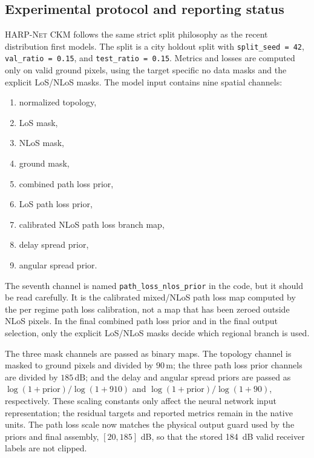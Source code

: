 \subsection{Experimental protocol and reporting status}

\textsc{HARP-Net CKM} follows the same strict split philosophy as the recent
distribution first models. The split is a city holdout split with
\texttt{split\_seed = 42}, \texttt{val\_ratio = 0.15}, and
\texttt{test\_ratio = 0.15}. Metrics and losses are computed only on valid
ground pixels, using the target specific no data masks and the explicit
LoS/NLoS masks. The model input contains nine spatial channels:

\begin{enumerate}
\item normalized topology,
\item LoS mask,
\item NLoS mask,
\item ground mask,
\item combined path loss prior,
\item LoS path loss prior,
\item calibrated NLoS path loss branch map,
\item delay spread prior,
\item angular spread prior.
\end{enumerate}

The seventh channel is named \texttt{path\_loss\_nlos\_prior} in the code,
but it should be read carefully. It is the calibrated mixed/NLoS path loss map
computed by the per regime path loss calibration, not a map that has been
zeroed outside NLoS pixels. In the final combined path loss prior and in the
final output selection, only the explicit LoS/NLoS masks decide which regional
branch is used.

The three mask channels are passed as binary maps. The topology channel is
masked to ground pixels and divided by \(90\,\mathrm{m}\); the three
path loss prior channels are divided by \(185\,\mathrm{dB}\); and the
delay and angular spread priors are passed as
\(\log(1+\mathrm{prior})/\log(1+910)\) and
\(\log(1+\mathrm{prior})/\log(1+90)\), respectively. These scaling constants
only affect the neural network input representation; the residual targets and
reported metrics remain in the native units. The path loss scale now matches
the physical output guard used by the priors and final assembly,
\([20,185]\) dB, so that the stored
\SI{184}{dB} valid receiver labels are not clipped.

